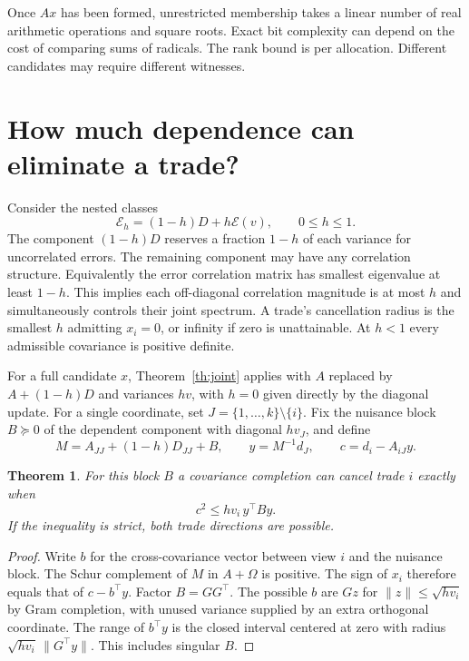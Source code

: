 \documentclass[11pt]{article}
\newtheorem{theorem}{Theorem}
\begin{document}
Once $Ax$ has been formed, unrestricted membership takes a linear number of real arithmetic operations and square roots. Exact bit complexity can depend on the cost of comparing sums of radicals. The rank bound is per allocation. Different candidates may require different witnesses.



\section{How much dependence can eliminate a trade?}
Consider the nested classes
\[
 \mathcal E_h=(1-h)D+h\mathcal E(v),\qquad 0\le h\le1 .
\]
The component $(1-h)D$ reserves a fraction $1-h$ of each variance for uncorrelated errors. The remaining component may have any correlation structure. Equivalently the error correlation matrix has smallest eigenvalue at least $1-h$. This implies each off-diagonal correlation magnitude is at most $h$ and simultaneously controls their joint spectrum. A trade's cancellation radius is the smallest $h$ admitting $x_i=0$, or infinity if zero is unattainable. At $h<1$ every admissible covariance is positive definite.

For a full candidate $x$, Theorem~\ref{th:joint} applies with $A$ replaced by $A+(1-h)D$ and variances $hv$, with $h=0$ given directly by the diagonal update. For a single coordinate, set $J=\{1,\ldots,k\}\setminus\{i\}$. Fix the nuisance block $B\succeq0$ of the dependent component with diagonal $hv_J$, and define
\[
 M=A_{JJ}+(1-h)D_{JJ}+B,\qquad y=M^{-1}d_J,\qquad c=d_i-A_{iJ}y.
\]
\begin{theorem}\label{th:sign}
For this block $B$ a covariance completion can cancel trade $i$ exactly when
\begin{equation}\label{eq:sign}
                     c^2\le hv_i\,y^\top B y .
\end{equation}
If the inequality is strict, both trade directions are possible.
\end{theorem}
\begin{proof}
Write $b$ for the cross-covariance vector between view $i$ and the nuisance block. The Schur complement of $M$ in $A+\Omega$ is positive. The sign of $x_i$ therefore equals that of $c-b^\top y$. Factor $B=GG^\top$. The possible $b$ are $Gz$ for $\|z\|\le\sqrt{hv_i}$ by Gram completion, with unused variance supplied by an extra orthogonal coordinate. The range of $b^\top y$ is the closed interval centered at zero with radius $\sqrt{hv_i}\,\|G^\top y\|$. This includes singular $B$.
\end{proof}
\end{document}
